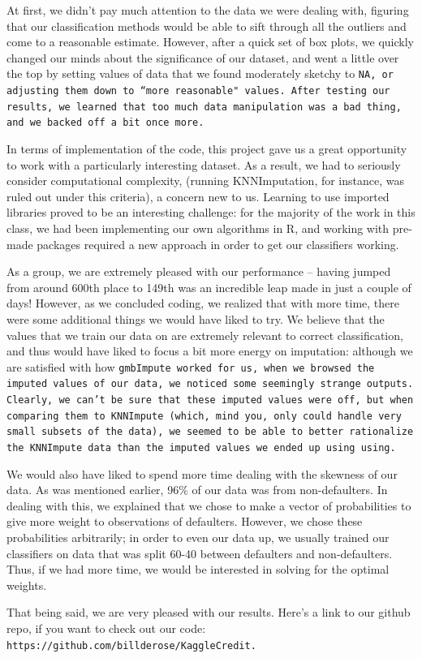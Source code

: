 \documentclass[11pt, oneside]{article}   	%
\begin{document}
	At first, we didn't pay much attention to the data we were dealing with, figuring that our classification methods would be able to sift through all the outliers and come to a reasonable estimate. However, after a quick set of box plots, we quickly changed our minds about the significance of our dataset, and went a little over the top by setting values of data that we found moderately sketchy to \tt NA\rm, or adjusting them down to ``more reasonable" values. After testing our results, we learned that too much data manipulation was a bad thing, and we backed off a bit once more.
	
	
	In terms of implementation of the code, this project gave us a great opportunity to work with a particularly interesting dataset. As a result, we had to seriously consider computational complexity, (running KNNImputation, for instance, was ruled out under this criteria), a concern new to us. Learning to use imported libraries proved to be an interesting challenge: for the majority of the work in this class, we had been implementing our own algorithms in R, and working with pre-made packages required a new approach in order to get our classifiers working.
	
		As a group, we are extremely pleased with our performance -- having jumped from around 600th place to 149th was an incredible leap made in just a couple of days! However, as we concluded coding, we realized that with more time, there were some additional things we would have liked to try. We believe that the values that we train our data on are extremely relevant to correct classification, and thus would have liked to focus a bit more energy on imputation: although we are satisfied with how \tt gmbImpute\rm~worked for us, when we browsed the imputed values of our data, we noticed some seemingly strange outputs. Clearly, we can't be sure that these imputed values were off, but when comparing them to \tt KNNImpute\rm~(which, mind you, only could handle very small subsets of the data), we seemed to be able to better rationalize the \tt KNNImpute\rm~data than the imputed values we ended up using using. 
		
		
	We would also have liked to spend more time dealing with the skewness of our data. As was mentioned earlier, 96\% of our data was from non-defaulters. In dealing with this, we explained that we chose to make a vector of probabilities to give more weight to observations of defaulters. However, we chose these probabilities arbitrarily; in order to even our data up, we usually trained our classifiers on data that was split 60-40 between defaulters and non-defaulters. Thus, if we had more time, we would be interested in solving for the optimal weights.
	
	
	That being said, we are very pleased with our results. Here's a link to our github repo, if you want to check out our code: \tt https://github.com/billderose/KaggleCredit.
\end{document}
